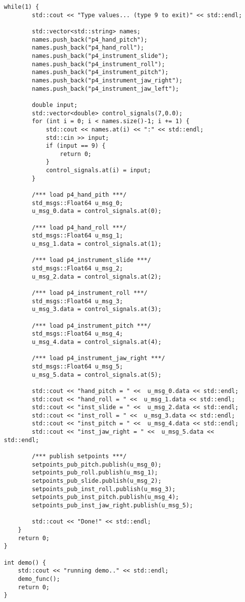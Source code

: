 \begin{lstlisting}[language=gedit]
    while(1) {
        std::cout << "Type values... (type 9 to exit)" << std::endl;

        std::vector<std::string> names;  
        names.push_back("p4_hand_pitch");
        names.push_back("p4_hand_roll");
        names.push_back("p4_instrument_slide");
        names.push_back("p4_instrument_roll");
        names.push_back("p4_instrument_pitch");
        names.push_back("p4_instrument_jaw_right");
        names.push_back("p4_instrument_jaw_left");

        double input;
        std::vector<double> control_signals(7,0.0);
        for (int i = 0; i < names.size()-1; i += 1) {
            std::cout << names.at(i) << ":" << std::endl;
            std::cin >> input;
            if (input == 9) {
                return 0;
            }
            control_signals.at(i) = input;
        }
   
        /*** load p4_hand_pith ***/
        std_msgs::Float64 u_msg_0;
        u_msg_0.data = control_signals.at(0);

        /*** load p4_hand_roll ***/
        std_msgs::Float64 u_msg_1;
        u_msg_1.data = control_signals.at(1);

        /*** load p4_instrument_slide ***/
        std_msgs::Float64 u_msg_2;
        u_msg_2.data = control_signals.at(2);

        /*** load p4_instrument_roll ***/
        std_msgs::Float64 u_msg_3;
        u_msg_3.data = control_signals.at(3);
        
        /*** load p4_instrument_pitch ***/
        std_msgs::Float64 u_msg_4;
        u_msg_4.data = control_signals.at(4);

        /*** load p4_instrument_jaw_right ***/
        std_msgs::Float64 u_msg_5;
        u_msg_5.data = control_signals.at(5);
 
        std::cout << "hand_pitch = " <<  u_msg_0.data << std::endl;
        std::cout << "hand_roll = " <<  u_msg_1.data << std::endl;
        std::cout << "inst_slide = " <<  u_msg_2.data << std::endl;
        std::cout << "inst_roll = " <<  u_msg_3.data << std::endl;
        std::cout << "inst_pitch = " <<  u_msg_4.data << std::endl;
        std::cout << "inst_jaw_right = " <<  u_msg_5.data << std::endl;

        /*** publish setpoints ***/
        setpoints_pub_pitch.publish(u_msg_0);
        setpoints_pub_roll.publish(u_msg_1);
        setpoints_pub_slide.publish(u_msg_2);
        setpoints_pub_inst_roll.publish(u_msg_3);
        setpoints_pub_inst_pitch.publish(u_msg_4);
        setpoints_pub_inst_jaw_right.publish(u_msg_5);

        std::cout << "Done!" << std::endl;        
    }
    return 0;
}

int demo() {
    std::cout << "running demo.." << std::endl;
    demo_func();
    return 0;
}
\end{lstlisting}
